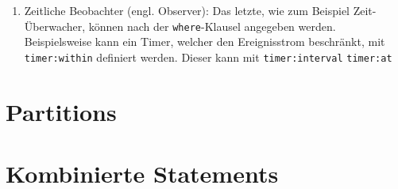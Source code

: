 \begin{enumerate}
	\begin{lstlisting}[caption={Pattern mit Follow-Operator }\label{follow_pattern},captionpos=t,language=SQL]
	
	every a = GameAction(action="FOLD") -> b =
	 GameEnd(a.playerName != b.playerName)
	
	\end{lstlisting}
	
	\item Zeitliche Beobachter (engl. Observer):
	Das letzte, wie zum Beispiel Zeit-Überwacher, können nach der \texttt{where}-Klausel angegeben werden. Beispielsweise kann ein Timer, welcher den Ereignisstrom beschränkt, mit \texttt{timer:within} definiert werden. Dieser kann mit \texttt{timer:interval}
	\texttt{timer:at}
\end{enumerate}


\section{Partitions}

\section{Kombinierte Statements}

